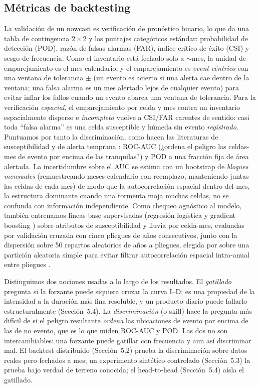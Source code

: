 \documentclass[authoryear,preprint,review,12pt]{elsarticle}
\begin{document}
\subsection{Métricas de backtesting}

La validación de un nowcast es verificación de pronóstico binario, lo que da una
tabla de contingencia $2\times2$ y los puntajes categóricos estándar: probabilidad
de detección (POD), razón de falsas alarmas (FAR), índice crítico de éxito (CSI) y
sesgo de frecuencia. Como el inventario está fechado solo a $\sim$mes, la unidad de
emparejamiento es el mes calendario, y el emparejamiento es \emph{event-céntrico}
con una ventana de tolerancia $\pm$ (un evento es acierto si una alerta cae dentro
de la ventana; una falsa alarma es un mes alertado lejos de cualquier evento) para
evitar inflar los fallos cuando un evento abarca una ventana de tolerancia. Para la
verificación \emph{espacial}, el emparejamiento por celda y mes contra un
inventario espacialmente disperso e \emph{incompleto} vuelve a CSI/FAR carentes de
sentido: casi toda ``falsa alarma'' es una celda susceptible y húmeda sin evento
\emph{registrado}. Puntuamos por tanto la discriminación, como hacen las
literaturas de susceptibilidad y de alerta temprana \citep{reichenbach2018}:
ROC-AUC \citep{hanley1982} (¿ordena el peligro las celdas-mes de evento por encima
de las tranquilas?) y POD a una fracción fija de área alertada. La incertidumbre
sobre el AUC se estima con un bootstrap de \emph{bloques mensuales} (remuestreando
meses calendario con reemplazo, manteniendo juntas las celdas de cada mes) de modo
que la autocorrelación espacial dentro del mes, la estructura dominante cuando una
tormenta moja muchas celdas, no se confunda con información independiente. Como
chequeo agnóstico al modelo, también entrenamos líneas base supervisadas (regresión
logística y gradient boosting \citep{friedman2001}) sobre atributos de
susceptibilidad y lluvia por celda-mes, evaluadas por validación cruzada con
cinco pliegues de años consecutivos, junto con la dispersión sobre 50 repartos
aleatorios de años a pliegues, elegida por sobre una partición aleatoria
simple para evitar filtrar autocorrelación espacial intra-anual entre pliegues
\citep{roberts2016}.

Distinguimos dos nociones usadas a lo largo de los resultados. El
\emph{gatillado} pregunta si la forzante puede siquiera cruzar la curva I--D; es
una propiedad de la intensidad a la duración más fina resoluble, y un producto
diario puede fallarlo estructuralmente (Sección~5.4). La \emph{discriminación} (o
skill) hace la pregunta más difícil de si el peligro resultante \emph{ordena} las
ubicaciones de evento por encima de las de no evento, que es lo que miden ROC-AUC y
POD. Las dos no son intercambiables: una forzante puede gatillar con frecuencia y
aun así discriminar mal. El backtest distribuido (Sección~5.2) prueba la
discriminación sobre datos reales pero fechados a mes; un experimento sintético
controlado (Sección~5.3) la prueba bajo verdad de terreno conocida; el head-to-head
(Sección~5.4) aísla el gatillado.
\end{document}
